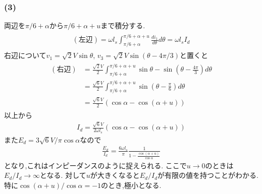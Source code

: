 \documentclass[uplatex,a4j,11pt,dvipdfmx]{jsarticle}
\begin{document}
\subsubsection*{(3)}
両辺を$\pi/6+\alpha$から$\pi/6+\alpha+u$まで積分する.
\begin{align}
  \begin{split}
    (左辺)=\omega l_s\int_{\pi/6+\alpha}^{\pi/6+\alpha+u}\frac{d i_1}{d\theta}d\theta
    =\omega l_sI_d
  \end{split}
\end{align}
右辺について$v_1=\sqrt{2}V\sin \theta$, $v_3=\sqrt{2}V\sin(\theta-4\pi/3)$と置くと
\begin{align}
  \begin{split}
    (右辺)&=\frac{\sqrt{2}V}{2}\int_{\pi/6+\alpha}^{\pi/6+\alpha+u}\sin \theta-\sin\left(\theta-\frac{4\pi}{3}\right)d\theta\\
    &=\frac{\sqrt{6}V}{2}\int_{\pi/6+\alpha}^{\pi/6+\alpha+u}\sin\left(\theta-\frac{\pi}{6}\right)d\theta\\
    &=\frac{\sqrt{6}V}{2}(\cos \alpha-\cos(\alpha+u))
  \end{split}
\end{align}
以上から
\begin{align}
  I_d=\frac{\sqrt{6}V}{2\omega l_s}(\cos \alpha-\cos(\alpha+u))
\end{align}
また$E_d=3\sqrt{6}V/\pi\cos\alpha$なので
\begin{align}
  \frac{E_d}{I_d}=\frac{6\omega l_s}{\pi}\frac{1}{1-\frac{\cos(\alpha+u)}{\cos\alpha}}
\end{align}
となり,これはインピーダンスのように捉えられる.
ここで$u\rightarrow0$のときは$E_d/I_d\rightarrow\infty$となる.
対して$u$が大きくなると$E_d/I_d$が有限の値を持つことがわかる.
特に$\cos(\alpha+u)/\cos\alpha=-1$のとき,極小となる.
\end{document}

